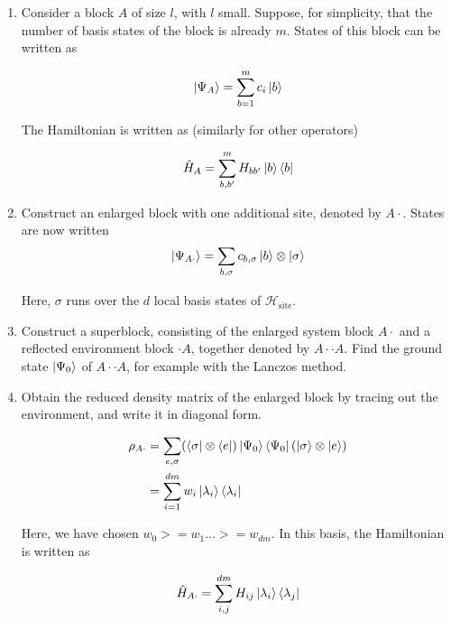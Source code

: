 \begin{enumerate}
  \item \label{step1} Consider a block $A$ of size $l$, with $l$ small. Suppose, for
  simplicity, that the number of basis states of the block is already
  $m$. States of this block can be written as
 
  \begin{equation}  
    \ket{\Psi_A} = \sum_{b = 1}^{m} c_{i} \ket{b}
  \end{equation}

  The Hamiltonian is written as (similarly for other operators)

  \begin{equation}
    \hat{H}_{A} = \sum_{b, b'}^{m} H_{b b'} \ket{b} \bra{b}
  \end{equation}

  \item Construct an enlarged block with one additional site, denoted by $A
  \cdot$. States are now written
  \begin{equation}
    \ket{\Psi_{A\cdot}} = \sum_{b, \sigma} c_{b, \sigma} \ket{b} \otimes \ket{\sigma}
  \end{equation}

  Here, $\sigma$ runs over the $d$ local basis states of $\mathcal{H}_{\text{site}}$.

  \item Construct a superblock, consisting of the enlarged system block $A
  \cdot$ and a reflected environment block $\cdot A$, together denoted by $A \cdot
  \cdot A$. Find the ground state $\ket{\Psi_0}$ of $A \cdot \cdot A$, for example
  with the Lanczos method.

  \item Obtain the reduced density matrix of the enlarged block by tracing out
  the environment, and write it in diagonal form.

  \begin{equation}
  \begin{aligned}
    \rho_{A \cdot} & = \sum_{e, \sigma} (\bra{\sigma} \otimes \bra{e}) \ket{\Psi_0} \bra{\Psi_0} (\ket{\sigma} \otimes \ket{e}) \\
    & = \sum_{i = 1}^{d m} w_{i} \ket{\lambda_i} \bra{\lambda_i}
  \end{aligned}
  \end{equation}

  Here, we have chosen $w_0 >= w_1 \ldots >= w_{d m}$. In this basis, the Hamiltonian is written as

  \begin{equation}
    \hat{H}_{A \cdot} = \sum_{i, j}^{d m} H_{ij} \ket{\lambda_i}\bra{\lambda_j}
  \end{equation}


\end{enumerate}
